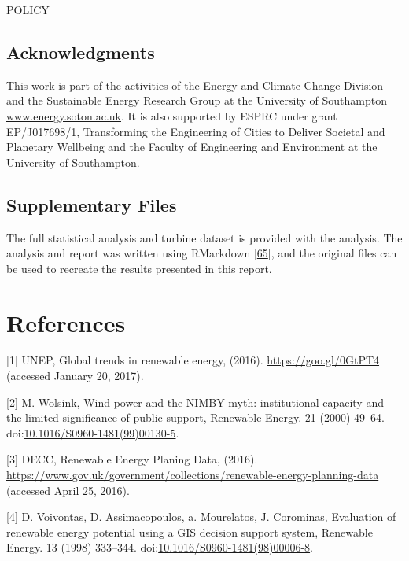 \documentclass[a4paper,]{article}
\theoremstyle{definition}
\theoremstyle{definition}
\theoremstyle{definition}
\theoremstyle{remark}
\begin{document}
POLICY

\subsection*{Acknowledgments}\label{acknowledgments}

This work is part of the activities of the Energy and Climate Change
Division and the Sustainable Energy Research Group at the University of
Southampton \url{www.energy.soton.ac.uk}. It is also supported by ESPRC
under grant EP/J017698/1, Transforming the Engineering of Cities to
Deliver Societal and Planetary Wellbeing and the Faculty of Engineering
and Environment at the University of Southampton.

\subsection*{Supplementary Files}\label{supplementary-files}

The full statistical analysis and turbine dataset is provided with the
analysis. The analysis and report was written using RMarkdown
{[}\protect\hyperlink{ref-R-rmarkdown}{65}{]}, and the original files
can be used to recreate the results presented in this report.

\section*{References}\label{references}

\hypertarget{refs}{}
\hypertarget{ref-UNEP2016}{}
{[}1{]} UNEP, Global trends in renewable energy, (2016).
\url{https://goo.gl/0GtPT4} (accessed January 20, 2017).

\hypertarget{ref-Wolsink2000}{}
{[}2{]} M. Wolsink, Wind power and the NIMBY-myth: institutional
capacity and the limited significance of public support, Renewable
Energy. 21 (2000) 49--64.
doi:\href{https://doi.org/10.1016/S0960-1481(99)00130-5}{10.1016/S0960-1481(99)00130-5}.

\hypertarget{ref-DECC2016}{}
{[}3{]} DECC, Renewable Energy Planing Data, (2016).
\url{https://www.gov.uk/government/collections/renewable-energy-planning-data}
(accessed April 25, 2016).

\hypertarget{ref-Voivontas1998}{}
{[}4{]} D. Voivontas, D. Assimacopoulos, a. Mourelatos, J. Corominas,
Evaluation of renewable energy potential using a GIS decision support
system, Renewable Energy. 13 (1998) 333--344.
doi:\href{https://doi.org/10.1016/S0960-1481(98)00006-8}{10.1016/S0960-1481(98)00006-8}.
\end{document}
